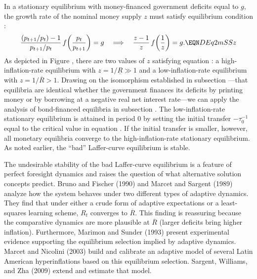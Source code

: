 In a stationary equilibrium with money-financed government deficits
equal to $g$, the growth rate of the nominal money supply $z$ must
satisfy equilibrium condition :
$$
  {(p_{t+1}/p_t) - 1 \over p_{t+1}/p_t}\,
        f\!\left({p_t \over p_{t+1}}\right) = g
  \quad \Longrightarrow \quad
  {z - 1 \over z}\,f\!\left({1 \over z}\right) = g.
  \EQN DEq2mSSz
$$
As depicted in Figure , there are two values of $z$
satisfying equation : a high-inflation-rate equilibrium
with $z = 1/\underline{R} \gg 1$ and a low-inflation-rate equilibrium
with $z = 1/\overline{R} > 1$.
Drawing on the isomorphism established in subsection
---that equilibria are identical whether the
government finances its deficits by printing money or by borrowing at
a negative real net interest rate---we can apply the analysis of
bond-financed equilibria in subsection .
The low-inflation-rate stationary equilibrium is attained in period $0$
by setting the initial transfer $-\tau^{-1}_0$ equal to the critical
value in equation .
If the initial transfer is smaller, however, all monetary equilibria
converge to the high-inflation-rate stationary equilibrium.
As noted earlier, the ``bad'' Laffer-curve equilibrium is stable.

The undesirable stability of the bad Laffer-curve equilibrium is a
feature of perfect foresight dynamics and raises the question of what
alternative solution concepts predict.
Bruno and Fischer (1990) and Marcet and Sargent (1989) analyze how the
system behaves under two different types of adaptive dynamics.
They find that under either a crude form of adaptive expectations or a
least-squares learning scheme, $R_t$ converges to $\overline{R}$.
This finding is reassuring because the comparative dynamics are more
plausible at $\overline{R}$ (larger deficits bring higher inflation).
Furthermore, Marimon and Sunder (1993) present experimental evidence
supporting the equilibrium selection implied by adaptive dynamics.
Marcet and Nicolini (2003) build and calibrate an adaptive model of
several Latin American hyperinflations based on this equilibrium
selection.
Sargent, Williams, and Zha (2009) extend and estimate that model.

%
%
%
%
%
%
%
%
%

\bye
